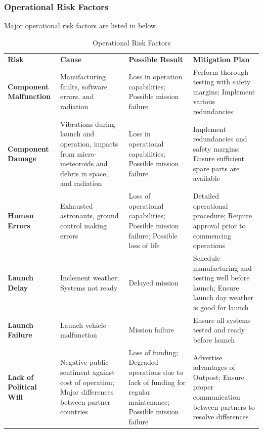\documentclass[12pt, letter]{article}
\begin{document}
\subsubsection{Operational Risk Factors}
\label{risks}
Major operational risk factors are listed in  below.
\begin{table}[H]
\caption{Operational Risk Factors}
\label{risktable}
\begin{tabular}{|P{3cm}|P{4cm}|P{3.8cm}|P{4.5cm}|}
\hline
\textbf{Risk}				&	\textbf{Cause}		&	\textbf{Possible Result}		&	\textbf{Mitigation Plan}		\\\hhline{|=|=|=|=|}
\textbf{Component Malfunction}	&	Manufacturing faults, software errors, and radiation	&	Loss in operation capabilities; Possible mission failure	&	Perform thorough testing with safety margins; Implement various redundancies	\\\hline
\textbf{Component Damage}	&	Vibrations during launch and operation, impacts from micro-meteoroids and debris in space, and radiation		&	Loss in operational capabilities; Possible mission failure	&	Implement redundancies and safety margins; Ensure sufficient spare parts are available	\\\hline
\textbf{Human Errors}		&	Exhausted astronauts, ground control making errors	&	Loss of operational capabilities; Possible mission failure; Possible loss of life	&	Detailed operational procedure; Require approval prior to commencing operations	\\\hline
\textbf{Launch Delay}	&	Inclement weather; Systems not ready	&	Delayed mission	& Schedule manufacturing and testing well before launch; Ensure launch day weather is good for launch	\\\hline
\textbf{Launch Failure}	&	Launch vehicle malfunction	&	Mission failure	&	Ensure all systems tested and ready before launch	\\\hline	
\textbf{Lack of Political Will}	&	Negative public sentiment against cost of operation; Major differences between partner countries	&	Loss of funding; Degraded operations due to lack of funding for regular maintenance; Possible mission failure	&	Advertise advantages of Outpost; Ensure proper communication between partners to resolve differences	\\\hline
\end{tabular}
\end{table}
\end{document}
